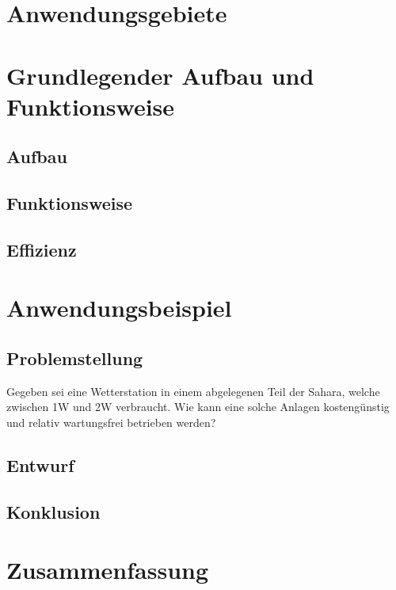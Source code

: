 \documentclass{article}
\begin{document}
    \section{Anwendungsgebiete}
    

    \section{Grundlegender Aufbau und Funktionsweise}
        \subsection{Aufbau}
        \subsection{Funktionsweise}
        \subsection{Effizienz}

    \section{Anwendungsbeispiel}
        \subsection{Problemstellung}
            Gegeben sei eine Wetterstation in einem abgelegenen Teil der Sahara,
            welche zwischen 1W und 2W verbraucht. Wie kann eine solche Anlagen
            kostengünstig und relativ wartungsfrei betrieben werden?
        \subsection{Entwurf}
        \subsection{Konklusion}

    \section{Zusammenfassung}

    
\end{document}

